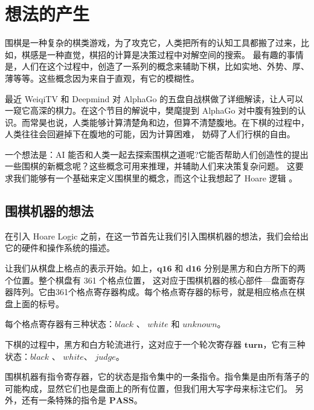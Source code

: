 \section{想法的产生}

围棋是一种复杂的棋类游戏，为了攻克它，人类把所有的认知工具都搬了过来，比如，棋感是一种直觉，棋招的计算是决策过程中对解空间的搜索。
最有趣的事情是，人们在这个过程中，创造了一系列的概念来辅助下棋，比如实地、外势、厚、薄等等。这些概念因为来自于直观，有它的模糊性。

最近 WeiqiTV 和 Deepmind 对 AlphaGo 的五盘自战棋做了详细解读，让人可以一窥它高深的棋力。在这个节目的解说中，樊麾提到 AlphaGo
对中腹有独到的认识。而常昊也说，人类能够计算清楚角和边，但算不清楚腹地。在下棋的过程中，人类往往会回避掉下在腹地的可能，因为计算困难，
妨碍了人们行棋的自由。

一个想法是：AI 能否和人类一起去探索围棋之道呢?它能否帮助人们创造性的提出一些围棋的新概念呢？这些概念可用来推理，并辅助人们来决策复杂问题。
这要求我们能够有一个基础来定义围棋里的概念，而这个让我想起了 Hoare 逻辑 。

\subsection{围棋机器的想法}

在引入 Hoare Logic 之前，在这一节首先让我们引入围棋机器的想法，我们会给出它的硬件和操作系统的描述。

\setcounter{gomove}{-1}
\begin{center}
\begin{psgoboard}
\end{psgoboard}
\end{center}

让我们从棋盘上格点的表示开始。如上，$\mathbf{q16}$ 和 $\mathbf{d16}$ 分别是黑方和白方所下的两个位置。整个棋盘有 361 个格点位置，
这对应于围棋机器的核心部件—盘面寄存器阵列。它由361个格点寄存器构成。每个格点寄存器的标号，就是相应格点在棋盘上面的标号。

每个格点寄存器有三种状态：$\mathit{black}$ 、 $\mathit{white}$ 和 $\mathit{unknown}$。

下棋的过程中，黑方和白方轮流进行，这对应于一个轮次寄存器 $\mathbf{turn}$，它有三种状态：$\mathit{black}$ 、 $\mathit{white}$、 $\mathit{judge}$。

围棋机器有指令寄存器，它的状态是指令集中的一条指令。指令集是由所有落子的可能构成，显然它们也是盘面上的所有位置，但我们用大写字母来标注它们。
另外，还有一条特殊的指令是 $\mathbf{PASS}$。

